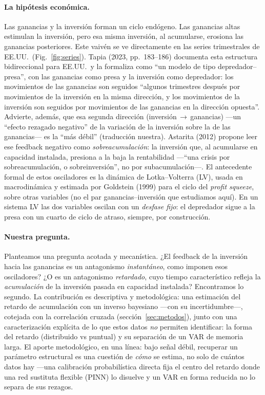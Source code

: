 \documentclass[11pt]{article}
\begin{document}
\paragraph{La hipótesis económica.} Las ganancias y la inversión forman un ciclo endógeno. Las
ganancias altas estimulan la inversión, pero esa misma inversión, al acumularse, erosiona las
ganancias posteriores. Este vaivén se ve directamente en las series trimestrales de EE.UU.\ (Fig.~\ref{fig:series}). Tapia (2023, pp.~183--186) documenta esta estructura bidireccional para
EE.UU.\ y la formaliza como ``un modelo de tipo depredador--presa'', con las ganancias como presa y
la inversión como depredador: los movimientos de las ganancias son seguidos ``algunos trimestres
después por movimientos de la inversión en la misma dirección, y los movimientos de la inversión son
seguidos por movimientos de las ganancias en la dirección opuesta''. Advierte, además, que esa
segunda dirección (inversión\,$\to$\,ganancias) ---un ``efecto rezagado negativo'' de la variación de
la inversión sobre la de las ganancias--- es la ``más débil'' (traducción nuestra). Astarita (2012) propone leer ese
feedback negativo como \emph{sobreacumulación}: la inversión que, al acumularse en capacidad
instalada, presiona a la baja la rentabilidad ---``una crisis por sobreacumulación, o
sobreinversión'', no por subacumulación---. El antecedente formal de estos osciladores es la
dinámica de Lotka--Volterra (LV), usada en macrodinámica y estimada por Goldstein (1999) para el ciclo del \emph{profit squeeze},
sobre otras variables (no el par ganancias--inversión que estudiamos aquí). En un sistema LV las dos variables oscilan con un \emph{desfase fijo}: el depredador
sigue a la presa con un cuarto de ciclo de atraso, siempre, por construcción.

\paragraph{Nuestra pregunta.} Planteamos una pregunta acotada y mecanística. ¿El feedback de la
inversión hacia las ganancias es un antagonismo \emph{instantáneo}, como imponen esos osciladores?
¿O es un antagonismo \emph{retardado}, cuyo tiempo característico refleja la \emph{acumulación} de la
inversión pasada en capacidad instalada? Encontramos lo segundo. La contribución es descriptiva y
metodológica: una estimación del retardo de acumulación con un inverso bayesiano ---con su
incertidumbre---, cotejada con la correlación cruzada (sección~\ref{sec:metodos}), junto con una
caracterización explícita de lo que estos datos \emph{no} permiten identificar: la forma del retardo
(distribuido vs puntual) y su separación de un VAR de memoria larga. El aporte metodológico, en una
línea: bajo señal débil, recuperar un parámetro estructural es una cuestión de \emph{cómo} se estima,
no solo de cuántos datos hay ---una calibración probabilística directa fija el centro del retardo
donde una red sustituta flexible (PINN) lo disuelve y un VAR en forma reducida no lo separa de sus
rezagos.
\end{document}

